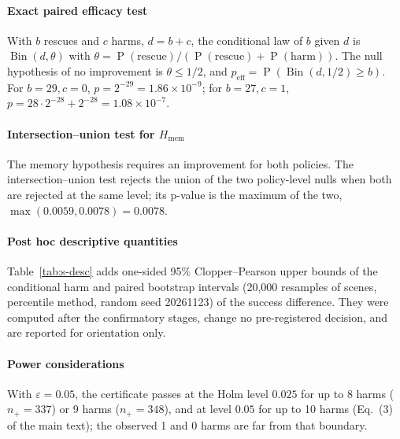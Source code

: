 \documentclass[preprint,12pt]{elsarticle}
\newcommand{\tabdir}{}
\renewcommand{\Pr}{\operatorname{P}}
\newcommand{\Bin}{\operatorname{Bin}}
\begin{document}
\paragraph{Exact paired efficacy test} With $b$ rescues and $c$ harms, $d=b+c$, the conditional law of $b$ given $d$ is $\Bin(d,\theta)$ with $\theta=\Pr(\text{rescue})/(\Pr(\text{rescue})+\Pr(\text{harm}))$. The null hypothesis of no improvement is $\theta\le1/2$, and $p_{\mathrm{eff}}=\Pr(\Bin(d,1/2)\ge b)$. For $b=29,c=0$, $p=2^{-29}=1.86\times10^{-9}$; for $b=27,c=1$, $p=28\cdot2^{-28}+2^{-28}=1.08\times10^{-7}$.

\paragraph{Intersection--union test for $H_{\mathrm{mem}}$} The memory hypothesis requires an improvement for both policies. The intersection--union test rejects the union of the two policy-level nulls when both are rejected at the same level; its p-value is the maximum of the two, $\max(0.0059,0.0078)=0.0078$.

\paragraph{Post hoc descriptive quantities} Table~\ref{tab:s-desc} adds one-sided 95\% Clopper--Pearson upper bounds of the conditional harm and paired bootstrap intervals (20,000 resamples of scenes, percentile method, random seed 20261123) of the success difference. They were computed after the confirmatory stages, change no pre-registered decision, and are reported for orientation only.

\begin{table}[!htbp]
\centering\footnotesize
\caption{Post hoc descriptive quantities for calibration and Final Test. ``Moved among $Y_0{=}1$'': baseline successes in which V2 made a move.}\label{tab:s-desc}
\resizebox{\linewidth}{!}{}
\end{table}

\paragraph{Power considerations} With $\varepsilon=0.05$, the certificate passes at the Holm level $0.025$ for up to 8 harms ($n_+=337$) or 9 harms ($n_+=348$), and at level $0.05$ for up to 10 harms (Eq.~(3) of the main text); the observed 1 and 0 harms are far from that boundary.
\end{document}
